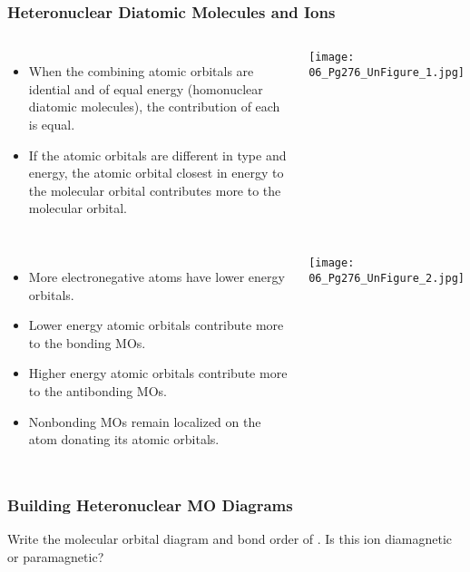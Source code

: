 \documentclass[handout]{beamer}
\begin{document}
\begin{frame}[c,allowframebreaks]
	\frametitle{Heteronuclear Diatomic Molecules and Ions}
	\begin{columns}
		\begin{itemize}
			\item When the combining atomic orbitals are idential and of
				equal energy (\alert{homonuclear} diatomic molecules),
				the contribution of each is equal.
			\item If the atomic orbitals are different in type and energy,
				the atomic orbital \alert{closest} in energy to the
				molecular orbital contributes more to the molecular
				orbital.
		\end{itemize}


		\begin{center}
			\texttt{[image: 06\_Pg276\_UnFigure\_1.jpg]}
		\end{center}
	\end{columns}

	\framebreak

	\begin{columns}
		\column{0.5\textwidth}
		\begin{itemize}
			\item More electronegative atoms have lower
			        energy orbitals.
			\item Lower energy atomic orbitals contribute
			        more to the \alert{bonding} MOs.
			\item Higher energy atomic orbitals contribute
			        more to the \alert{antibonding} MOs.
			\item \alert{Nonbonding} MOs remain localized on
				the atom donating its atomic orbitals.
		\end{itemize}
		\column{0.5\textwidth}
		\begin{center}
			\texttt{[image: 06\_Pg276\_UnFigure\_2.jpg]}
		\end{center}
	\end{columns}
\end{frame}

\begin{frame}[t] %
	\frametitle{Building Heteronuclear MO Diagrams}
	Write the molecular orbital diagram and bond order of . Is this ion
	diamagnetic or paramagnetic?
\end{frame}


\end{document}
